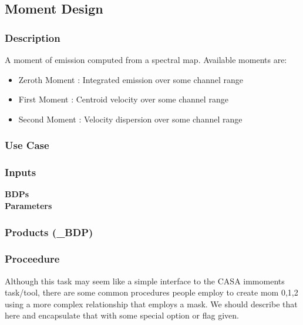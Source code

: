 \subsection{Moment Design}

\subsubsection{Description}
 A moment of emission computed from a spectral map.  Available moments 
 are:
 \begin{itemize}
 \item Zeroth Moment : Integrated emission over some channel range
 \item First Moment :  Centroid velocity over some channel range
 \item Second Moment : Velocity dispersion over some channel range
 \end{itemize}


\subsubsection{Use Case}



\subsubsection{Inputs}
{\bf BDPs}\\


{\bf Parameters}\\
\begin{description}
\item[]
\end{description}

\subsubsection{Products (\_BDP)}


\subsubsection{Proceedure}

Although this task may seem like a simple interface to the CASA immoments task/tool,
there are some common procedures people employ to create mom 0,1,2 using a more
complex relationship that employs a mask. We should describe that here and 
encapsulate that with some special option or flag given. 

\clearpage

